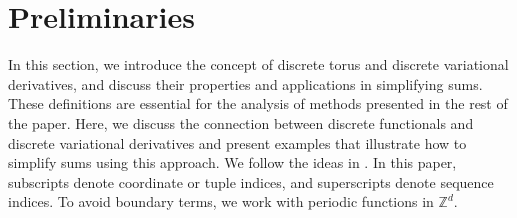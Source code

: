 \documentclass[runningheads]{llncs}
\newcommand{\Zz}{{\mathbb{Z}}}
\newcommand{\1}{\chi}
\begin{document}
\section{Preliminaries}
\label{assp}

In this section, we introduce the concept of discrete torus and discrete variational derivatives, and discuss their properties and applications in simplifying sums. 
These definitions are essential for the analysis of methods presented in the rest of the paper.
Here, we 
discuss the connection between discrete functionals and discrete variational derivatives and present examples that illustrate how to simplify sums using this approach.
We follow the ideas in \cite{gomes20}.
In this paper, subscripts denote coordinate or tuple indices, and superscripts denote sequence indices.
To avoid boundary terms, we work with periodic functions in $\Zz^d$.
\end{document}
